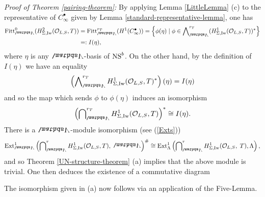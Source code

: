 \documentclass[a4paper, 
headsepline=off, DIV=12, titlepage=false]{scrartcl}
\begin{document}
\textit{Proof of Theorem \ref{pairing-theorem}:}
    By applying Lemma \ref{LittleLemma} (c) to the representative of $C_\infty^\bullet$ given by Lemma \ref{standard-representative-lemma}, one has
    \begin{align*}
        \mathrm{Fitt}^0_{\bLambda}(H^2_{\Sigma,\mathrm{Iw}}(\mathcal{O}_{L,S}, T)) & = \mathrm{Fitt}^{r_T}_{\bLambda}(H^1 (C^\bullet_\infty))
        = \left\{\phi(\eta) \mid \phi \in \exprod_{\bLambda}^{r_T} (H^1_{\Sigma, \Iw}(\cO_{L,S}, T))^*\right\} \\
        & =: I(\eta),
    \end{align*}
    where $\eta$ is any $\bLambda$-basis of $\mathrm{NS}^b$.
    On the other hand, by the definition of $I(\eta)$ we have an equality
    \begin{align*}
        \left(\exprod_{\bLambda}^{r_T} H^1_{\Sigma, \Iw}(\cO_{L,S}, T)^*\right)(\eta) = I(\eta)
    \end{align*}
    and so the map which sends $\phi$ to $\phi(\eta)$ induces an isomorphism
    \begin{align*}
        \left(\bidual_\bLambda^{r_T} H^1_{\Sigma, \Iw}(\cO_{L,S}, T)\right)^* \cong I(\eta).
    \end{align*}
    There is a $\bLambda$-module isomorphism (see (\ref{Exts}))
    \begin{align*}
        \Ext^1_\bLambda\left(\bidual_\bLambda^r H^1_{ \Sigma, \Iw}(\cO_{L,S}, T), \; \bLambda\right)^\# \cong \Ext_{\Lambda}^1\left(\bidual_\bLambda^r H^1_{ \Sigma, \Iw}(\cO_{L,S}, \; T), \Lambda\right),
    \end{align*}
    and so Theorem \ref{UN-structure-theorem} (a) implies that the above module is trivial. One then deduces the existence of a commutative diagram
    \begin{center}
    \end{center}
    The isomorphism given in (a) now follows via an application of the Five-Lemma. \\
    
\end{document}
